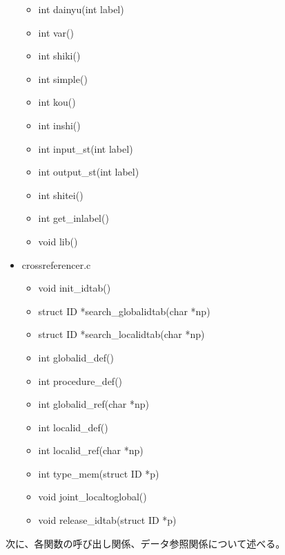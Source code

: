 \documentclass{jarticle}
\begin{document}
\begin{itemize}
\begin{itemize}
    \item int dainyu(int label)
    \item int var()
    \item int shiki()
    \item int simple()
    \item int kou()
    \item int inshi()
    \item int input\_st(int label)
    \item int output\_st(int label)
    \item int shitei()
    \item int get\_inlabel()
    \item void lib()
  \end{itemize}
  \item crossreferencer.c
  \begin{itemize}
    \item void init\_idtab()
    \item struct ID *search\_globalidtab(char *np)
    \item struct ID *search\_localidtab(char *np)
    \item int globalid\_def()
    \item int procedure\_def()
    \item int globalid\_ref(char *np)
    \item int localid\_def()
    \item int localid\_ref(char *np)
    \item int type\_mem(struct ID *p)
    \item void joint\_localtoglobal()
    \item void release\_idtab(struct ID *p)
  \end{itemize}
\end{itemize}
次に、各関数の呼び出し関係、データ参照関係について述べる。
\end{document}
